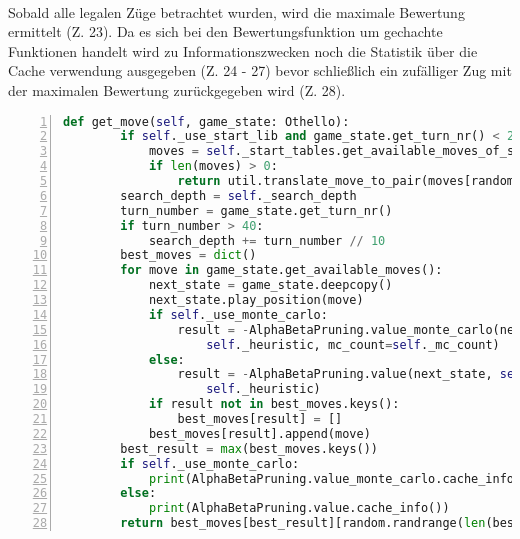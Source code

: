 \\Sobald alle legalen Züge betrachtet wurden, wird die maximale Bewertung ermittelt (Z. 23). Da es sich bei den Bewertungsfunktion um gechachte Funktionen handelt wird zu Informationszwecken noch die Statistik über die Cache verwendung ausgegeben (Z. 24 - 27) bevor schließlich ein zufälliger Zug mit der maximalen Bewertung zurückgegeben wird (Z. 28).
\newpage
\begin{lstlisting}[basicstyle=\footnotesize,caption = {get\_move Funktion des \abp -Agenten}, language = python, captionpos = t , numbers=left, label={lst:ab-get-move}]
    def get_move(self, game_state: Othello):
        if self._use_start_lib and game_state.get_turn_nr() < 21:
            moves = self._start_tables.get_available_moves_of_start_tables(game_state)
            if len(moves) > 0:
                return util.translate_move_to_pair(moves[random.randrange(len(moves))])
        search_depth = self._search_depth
        turn_number = game_state.get_turn_nr()
        if turn_number > 40:
            search_depth += turn_number // 10
        best_moves = dict()
        for move in game_state.get_available_moves():
            next_state = game_state.deepcopy()
            next_state.play_position(move)
            if self._use_monte_carlo:
                result = -AlphaBetaPruning.value_monte_carlo(next_state, search_depth - 1,
                    self._heuristic, mc_count=self._mc_count)
            else:
                result = -AlphaBetaPruning.value(next_state, self._search_depth - 1,
                    self._heuristic)
            if result not in best_moves.keys():
                best_moves[result] = []
            best_moves[result].append(move)
        best_result = max(best_moves.keys())
        if self._use_monte_carlo:
            print(AlphaBetaPruning.value_monte_carlo.cache_info())
        else:
            print(AlphaBetaPruning.value.cache_info())
        return best_moves[best_result][random.randrange(len(best_moves[best_result]))]
\end{lstlisting}
